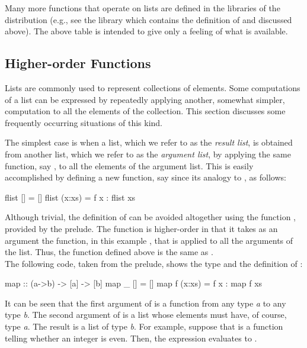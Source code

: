 \vspace*{2ex}

\noindent
Many more functions that operate on lists are defined
in the libraries of the \pakcs{} distribution
(e.g., see the library  which contains
the definition of  and  discussed above).
The above table is intended to give only a feeling
of what is available.

\subsection{Higher-order Functions}
\label{ho-list-functions}

Lists are commonly used to represent collections of elements.
Some computations of a list can be expressed by repeatedly
applying another, somewhat simpler, computation
to all the elements of the collection.
This section discusses some frequently occurring situations
of this kind.

The simplest case is when a list, which we refer to as the
\emph{result list}, is obtained from another list,
which we refer to as the \emph{argument list}, by applying
the same function, say , to all the elements of the argument list.
This is easily accomplished by defining a new function, say
 since its analogy to , as follows:
%
\begin{prog}
flist [] = []
flist (x:xs) = f x : flist xs
\end{prog}
%
Although trivial, the definition of  can be
avoided altogether using the function ,
provided by the prelude.
The function  is higher-order in that it takes
as an argument the function, in this example ,
that is applied to all the arguments of the list.
Thus, the function  defined above
is the same as .
\\[1ex]
The following code, taken from the prelude, shows
the type and the definition of :
%
\begin{prog}
map          :: (a->b) -> [a] -> [b]
map _ []     = []
map f (x:xs) = f x : map f xs
\end{prog}
%
It can be seen that the first argument of 
is a function from any type \emph{a} to any type \emph{b}.
The second argument of  is a list whose elements
must have, of course, type \emph{a}.
The result is a list of type \emph{b}.
For example, suppose that  is a function
telling whether an integer is even.
Then, the expression 
evaluates to .

